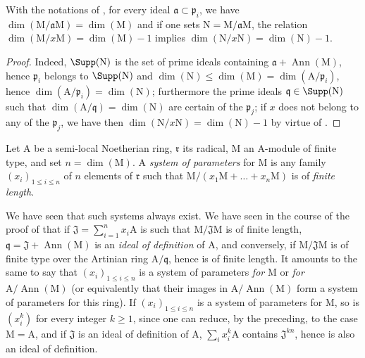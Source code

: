 \begin{corollary}[16.3.5]
\label{0.16.3.5}
With the notations of , for every ideal $\mathfrak{a}\subset\mathfrak{p}_i$, we have $\dim(\mathrm{M}/\mathfrak{a}\mathrm{M})=\dim(\mathrm{M})$ and if one sets $\mathrm{N}=\mathrm{M}/\mathfrak{a}\mathrm{M}$, the relation $\dim(\mathrm{M}/x\mathrm{M})=\dim(\mathrm{M})-1$ implies $\dim(\mathrm{N}/x\mathrm{N})=\dim(\mathrm{N})-1$.
\end{corollary}

\begin{proof}
Indeed, $\Supp(\mathrm{N})$ is the set of prime ideals containing $\mathfrak{a}+\operatorname{Ann}(\mathrm{M})$, hence $\mathfrak{p}_i$ belongs to $\Supp(\mathrm{N})$ and $\dim(\mathrm{N})\leq\dim(\mathrm{M})=\dim(\mathrm{A}/\mathfrak{p}_i)$, hence $\dim(\mathrm{A}/\mathfrak{p}_i)=\dim(\mathrm{N})$; furthermore the prime ideals $\mathfrak{q}\in\Supp(\mathrm{N})$ such that $\dim(\mathrm{A}/\mathfrak{q})=\dim(\mathrm{N})$ are certain of the $\mathfrak{p}_j$; if $x$ does not belong to any of the $\mathfrak{p}_j$, we have then $\dim(\mathrm{N}/x\mathrm{N})=\dim(\mathrm{N})-1$ by virtue of .
\end{proof}

\begin{definition}[16.3.6]
\label{0.16.3.6}
Let $\mathrm{A}$ be a semi-local Noetherian ring, $\mathfrak{r}$ its radical, $\mathrm{M}$ an $\mathrm{A}$-module of finite type, and set $n=\dim(\mathrm{M})$.
A \emph{system of parameters} for $\mathrm{M}$ is any family $(x_i)_{1\leq i\leq n}$ of $n$ elements of $\mathfrak{r}$ such that $\mathrm{M}/(x_1\mathrm{M}+\ldots+x_n\mathrm{M})$ is of \emph{finite length}.
\end{definition}

We have seen  that such systems always exist.
We have seen in the course of the proof of  that if $\mathfrak{J}=\sum_{i=1}^n x_i\mathrm{A}$ is such that $\mathrm{M}/\mathfrak{J}\mathrm{M}$ is of finite length, $\mathfrak{q}=\mathfrak{J}+\operatorname{Ann}(\mathrm{M})$ is an \emph{ideal of definition} of $\mathrm{A}$, and conversely, if $\mathrm{M}/\mathfrak{J}\mathrm{M}$ is of finite type over the Artinian ring $\mathrm{A}/\mathfrak{q}$, hence is of finite length.
It amounts to the same to say that $(x_i)_{1\leq i\leq n}$ is a system of parameters \emph{for} $\mathrm{M}$ or \emph{for} $\mathrm{A}/\operatorname{Ann}(\mathrm{M})$ (or equivalently that their images in $\mathrm{A}/\operatorname{Ann}(\mathrm{M})$ form a system of parameters for this ring).
If $(x_i)_{1\leq i\leq n}$ is a system of parameters for $\mathrm{M}$, so is $(x_i^k)$ for every integer $k\geq 1$, since one can reduce, by the preceding, to the case $\mathrm{M}=\mathrm{A}$, and if $\mathfrak{J}$ is an ideal of definition of $\mathrm{A}$, $\sum_i x_i^k\mathrm{A}$ contains $\mathfrak{J}^{kn}$, hence is also an ideal of definition.

